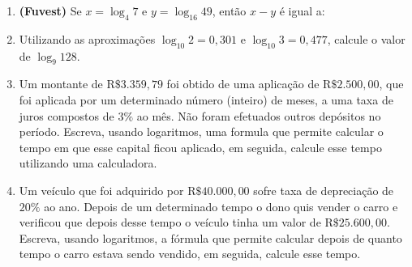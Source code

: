 \begin{enumerate}

\item {}\label{fuvest}

\textbf{(Fuvest)} Se $x = \log_4 7$ e $y = \log_{16} 49$, então $x - y$ é igual a:

\item {}\label{calculemudbase}

Utilizando as aproximações $\log_{10} 2 =0{,}301$  e $\log_{10} 3=0{,}477$, calcule o valor de $\log_9 128$.

\item {}\label{montanteaplicado}

Um montante de R$\$ 3.359{,}79$ foi obtido de uma aplicação de R$\$ 2.500{,}00$, que foi aplicada por um determinado número (inteiro) de meses, a uma taxa de juros compostos de $3\%$ ao mês. Não foram efetuados outros depósitos no período. Escreva, usando logaritmos, uma formula que permite calcular o tempo em que esse capital ficou aplicado, em seguida, calcule esse tempo utilizando uma calculadora.

\item {}\label{veiculodeprec}

Um veículo que foi adquirido por R$\$ 40.000{,}00$ sofre taxa de depreciação de $20\%$ ao ano. Depois de um determinado tempo o dono quis vender o carro e verificou que depois desse tempo o veículo tinha um valor de R$\$25.600,00$. Escreva, usando logaritmos, a fórmula que permite calcular depois de quanto tempo o carro estava sendo vendido, em seguida, calcule esse tempo.
\end{enumerate}

